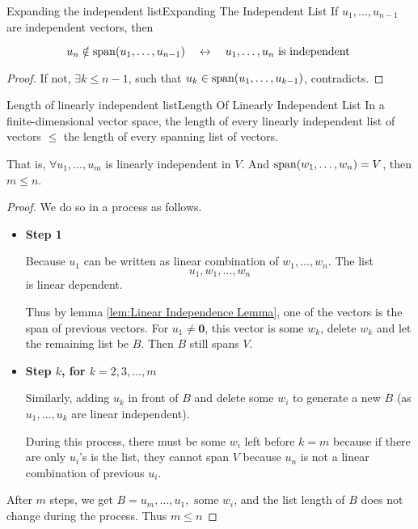 \documentclass[../main.tex]{subfiles}
\begin{document}
\begin{corollary}{Expanding the independent list}{Expanding The Independent List}
If $u_1, \ldots ,u_{n-1}$ are independent vectors, then 

\begin{equation}
u_n \notin \operatorname{span}(u_1, \ldots ,u_{n-1})\quad \leftrightarrow \quad u_1, \ldots ,u_n \text{ is independent }
\end{equation}

\end{corollary}
\begin{proof}
If not, $\exists k\leq n-1$, such that $u_k \in \operatorname{span}(u_1, \ldots ,u_{k-1})$, contradicts.
\end{proof}

\begin{theorem}{Length of linearly independent list}{Length Of Linearly Independent List}
In a finite-dimensional vector space, the length of every linearly independent list of vectors $\leq $ the length of every spanning list of vectors.

That is, $\forall u_1, \ldots ,u_m$ is linearly independent in $V$. And  $\operatorname{span}(w_1, \ldots ,w_n) = V$, then $m\leq n$.
\end{theorem}
\begin{proof}
We do so in a process as follows.
\begin{itemize}
\item \textbf{Step 1}

	Because $u_1$ can be written as linear combination of $w_1, \ldots ,w_n$. The list
	\begin{equation*}
	u_1, w_1, \ldots ,w_n
	\end{equation*}
	is linear dependent.

	Thus by lemma \ref{lem:Linear Independence Lemma}, one of the vectors is the span of previous vectors. For $u_1\neq \boldsymbol{0}$, this vector is some $w_k$, delete $w_k$ and let the remaining list be $B$. Then $B$ still spans $V$.
\item \textbf{Step $k$, for $k=2,3, \ldots ,m$}

	Similarly, adding $u_k$ in front of $B$ and delete some $w_i$ to generate a new $B$ (as $u_1, \ldots ,u_k$ are linear independent).

	During this process, there must be some $w_i$ left before $k=m$ because if there are only $u_i$'s is the list, they cannot span  $V$ because $u_n$ is not a linear combination of previous $u_i$.
\end{itemize}

After $m$ steps, we get $B = u_m, \ldots ,u_1, \text{ some }w_i$, and the list length of $B$ does not change during the process. Thus $m\leq n$
\end{proof}
\end{document}
